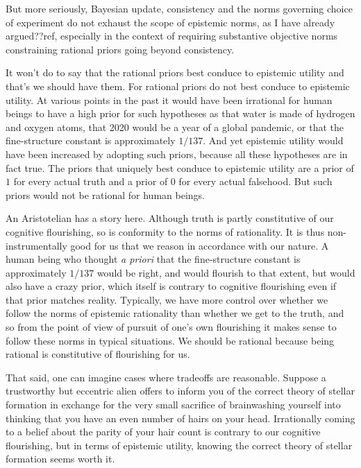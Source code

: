 But more seriously, Bayesian update, consistency and the norms governing choice of experiment do not exhaust the 
scope of epistemic norms, as I have already argued??ref, especially in the context of requiring substantive
objective norms constraining rational priors going beyond consistency. 

It won't do to say that the rational priors best conduce to epistemic utility and that's we should have them. 
For rational priors do not best conduce to epistemic utility. At various points in the past it would 
have been irrational for human beings to have a high prior for such hypotheses as that water is made of hydrogen
and oxygen atoms, that 2020 would be a year of a global pandemic, or that the fine-structure constant is 
approximately $1/137$. And yet epistemic utility would have been increased by adopting such priors, because 
all these hypotheses are in fact true. The priors that uniquely best conduce to epistemic utility are a 
prior of $1$ for every actual truth and a prior of $0$ for every actual falsehood. But such priors would not 
be rational for human beings. 

An Aristotelian has a story here. Although truth is partly constitutive of our cognitive flourishing, so is conformity 
to the norms of rationality. It is thus non-instrumentally good for us that we reason in accordance with our 
nature. A human being who thought \textit{a priori} that the fine-structure constant is approximately $1/137$
would be right, and would flourish to that extent, but would also have a crazy prior, which itself is contrary to 
cognitive flourishing even if that prior matches reality. Typically, we have more control over whether we follow the norms of epistemic rationality
than whether we get to the truth, and so from the point of view of pursuit of one's own flourishing it makes
sense to follow these norms in typical situations. We should be rational because being rational is constitutive
of flourishing for us.

That said, one can imagine cases where tradeoffs are reasonable. Suppose a trustworthy but eccentric alien
offers to inform you of the correct theory of stellar formation in exchange for the very small sacrifice 
of brainwashing yourself into thinking that you have an even number of hairs on your head. Irrationally
coming to a belief about the parity of your hair count is contrary to our cognitive flourishing, but in terms 
of epistemic utility, knowing the correct theory of stellar formation seems worth it.

